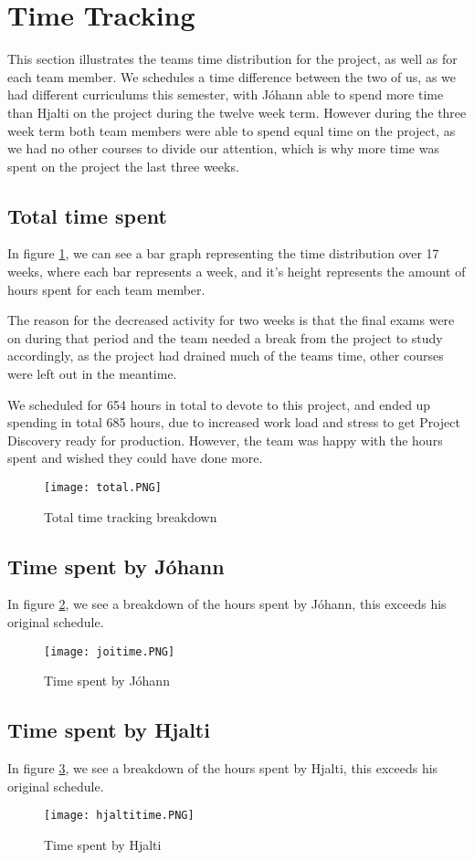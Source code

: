 \section{Time Tracking}\label{sec:timetracking}
This section illustrates the teams time distribution for the project, as well as for each team member. We schedules a time difference between the two of us, as we had different curriculums this semester, with Jóhann able to spend more time than Hjalti on the project during the twelve week term. However during the three week term both team members were able to spend equal time on the project, as we had no other courses to divide our attention, which is why more time was spent on the project the last three weeks.

\subsection{Total time spent}
In figure \ref{fig:totaltime}, we can see a bar graph representing the time distribution over 17 weeks, where each bar represents a week, and it's height represents the amount of hours spent for each team member. 

The reason for the decreased activity for two weeks is that the final exams were on during that period and the team needed a break from the project to study accordingly, as the project had drained much of the teams time, other courses were left out in the meantime.

We scheduled for 654 hours in total to devote to this project, and ended up spending in total 685 hours, due to increased work load and stress to get Project Discovery ready for production. However, the team was happy with the hours spent and wished they could have done more.

\begin{figure}[H]
	\centering
	\graphicspath{ {./graphics/} }
    \centerline{\texttt{[image: total.PNG]}}
    \caption{\label{fig:totaltime}Total time tracking breakdown}
\end{figure}

\subsection{Time spent by Jóhann}
In figure \ref{fig:joitime}, we see a breakdown of the hours spent by Jóhann, this exceeds his original schedule.
\begin{figure}[H]
	\centering
	\graphicspath{ {./graphics/} }
    \centerline{\texttt{[image: joitime.PNG]}}
    \caption{\label{fig:joitime}Time spent by Jóhann}
\end{figure}

\subsection{Time spent by Hjalti}
In figure \ref{fig:hjaltitime}, we see a breakdown of the hours spent by Hjalti, this exceeds his original schedule. 
\begin{figure}[H]
	\centering
	\graphicspath{ {./graphics/} }
    \centerline{\texttt{[image: hjaltitime.PNG]}}
    \caption{\label{fig:hjaltitime}Time spent by Hjalti}
\end{figure}